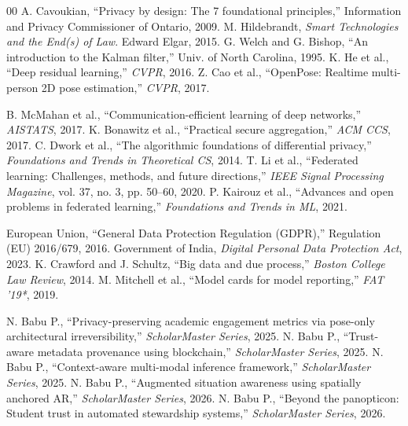 \documentclass[conference]{IEEEtran}
\begin{document}
\begin{thebibliography}{00}
 A. Cavoukian, ``Privacy by design: The 7 foundational principles,'' Information and Privacy Commissioner of Ontario, 2009.
 M. Hildebrandt, \textit{Smart Technologies and the End(s) of Law}. Edward Elgar, 2015.
 G. Welch and G. Bishop, ``An introduction to the Kalman filter,'' Univ. of North Carolina, 1995.
 K. He et al., ``Deep residual learning,'' \textit{CVPR}, 2016.
 Z. Cao et al., ``OpenPose: Realtime multi-person 2D pose estimation,'' \textit{CVPR}, 2017.

 B. McMahan et al., ``Communication-efficient learning of deep networks,'' \textit{AISTATS}, 2017.
 K. Bonawitz et al., ``Practical secure aggregation,'' \textit{ACM CCS}, 2017.
 C. Dwork et al., ``The algorithmic foundations of differential privacy,'' \textit{Foundations and Trends in Theoretical CS}, 2014.
 T. Li et al., ``Federated learning: Challenges, methods, and future directions,'' \textit{IEEE Signal Processing Magazine}, vol. 37, no. 3, pp. 50--60, 2020.
 P. Kairouz et al., ``Advances and open problems in federated learning,'' \textit{Foundations and Trends in ML}, 2021.

 European Union, ``General Data Protection Regulation (GDPR),'' Regulation (EU) 2016/679, 2016.
 Government of India, \textit{Digital Personal Data Protection Act}, 2023.
 K. Crawford and J. Schultz, ``Big data and due process,'' \textit{Boston College Law Review}, 2014.
 M. Mitchell et al., ``Model cards for model reporting,'' \textit{FAT '19*}, 2019.

 N. Babu P., ``Privacy-preserving academic engagement metrics via pose-only architectural irreversibility,'' \textit{ScholarMaster Series}, 2025.
 N. Babu P., ``Trust-aware metadata provenance using blockchain,'' \textit{ScholarMaster Series}, 2025.
 N. Babu P., ``Context-aware multi-modal inference framework,'' \textit{ScholarMaster Series}, 2025.
 N. Babu P., ``Augmented situation awareness using spatially anchored AR,'' \textit{ScholarMaster Series}, 2026.
 N. Babu P., ``Beyond the panopticon: Student trust in automated stewardship systems,'' \textit{ScholarMaster Series}, 2026.


\end{thebibliography}
\end{document}
